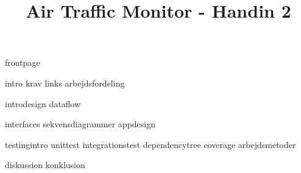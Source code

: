 \documentclass[a4paper]{article}								%
\title{Air Traffic Monitor - Handin 2}
\begin{document}

	{frontpage}

	\tableofcontents\thispagestyle{fancy} \newpage
	
	
	{intro}
	{krav}
	{links}
	{arbejdsfordeling}	

	{introdesign}
	{dataflow}
	
	{interfaces}
	{sekvensdiagrammer}
	{appdesign}


	{testingintro}
	{unittest}
	{integrationstest}
	{dependencytree}
	{coverage}
	{arbejdsmetoder}

	{diskussion}
	{konklusion}
	

\end{document}
